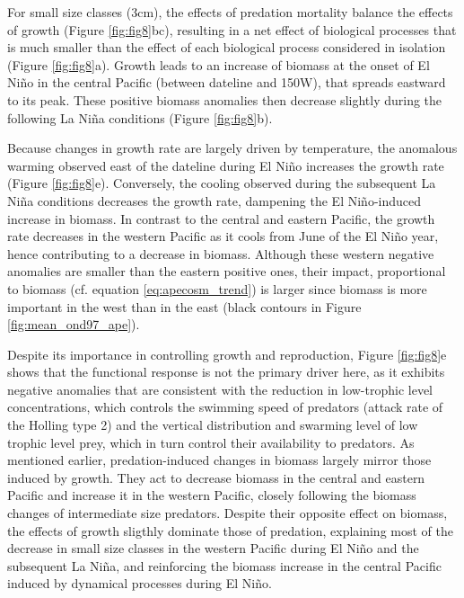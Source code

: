 For small size classes (3cm), the effects of predation mortality balance the effects of growth (Figure \ref{fig:fig8}bc), resulting in a net effect of biological processes that is much smaller than the effect of each biological process considered in isolation (Figure \ref{fig:fig8}a). Growth leads to an increase of biomass at the onset of El Niño in the central Pacific (between dateline and 150\degree{}W), that spreads eastward to its peak. These positive biomass anomalies then decrease slightly during the following La Niña conditions (Figure \ref{fig:fig8}b).

Because changes in growth rate are largely driven by temperature, the anomalous warming observed east of the dateline during El Niño increases the growth rate (Figure \ref{fig:fig8}e). Conversely, the cooling observed during the subsequent La Niña conditions decreases the growth rate, dampening the El Niño-induced increase in biomass. In contrast to the central and eastern Pacific, the growth rate decreases in the western Pacific as it cools from June of the El Niño year, hence  contributing to a decrease in biomass. Although these western negative anomalies are smaller than the eastern positive ones, their impact, proportional to biomass (cf. equation \ref{eq:apecosm_trend}) is larger since biomass is more important in the west than in the east (black contours in Figure \ref{fig:mean_ond97_ape}).

Despite its importance in controlling growth and reproduction, Figure \ref{fig:fig8}e shows that the functional response is not the primary driver here, as it exhibits negative anomalies that are consistent with the reduction in low-trophic level concentrations, which controls the swimming speed of predators (attack rate of the Holling type 2) and the vertical distribution and swarming level of low trophic level prey, which in turn control their availability to predators. As mentioned earlier, predation-induced changes in biomass largely mirror those induced by growth. They act to decrease biomass in the central and eastern Pacific and increase it in the western Pacific, closely following the biomass changes of intermediate size predators. Despite their opposite effect on biomass, the effects of growth sligthly dominate those of predation, explaining most of the decrease in small size classes in the western Pacific during El Niño and the subsequent La Niña, and reinforcing the biomass increase in the central Pacific induced by dynamical processes during El Niño.

